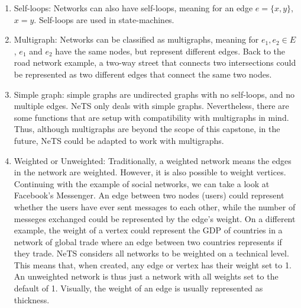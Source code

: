 \begin{enumerate}
  \item Self-loops: Networks can also have self-loops, meaning for an edge $e=\{x,y\}$, $x=y$.
  Self-loops are used in state-machines.
  \item Multigraph: Networks can be classified as multigraphs,
  meaning for $e_1,e_2\in E$, $e_1$ and $e_2$
  have the same nodes, but represent different edges. Back to the road network example, a two-way street that connects two
  intersections could be represented as two different edges that connect the same two nodes.
  \item Simple graph: simple graphs are undirected graphs with no self-loops, and no multiple edges.
  NeTS only deals with simple graphs.
  Nevertheless, there are some functions that are setup with compatibility with
  multigraphs in mind. Thus, although multigraphs are beyond the scope of this capstone,
  in the future, NeTS could be adapted to work with multigraphs.
  \item Weighted or Unweighted: Traditionally, a weighted network means the edges in the network are weighted.
  However, it is also possible to weight vertices.
  Continuing with the example of social networks,
  we can take a look at Facebook's Messenger.
  An edge between two nodes (users) could represent
  whether the users have ever sent messages to each other,
  while the number of messeges exchanged could
  be represented by the edge's weight.
  On a different example, the weight of a vertex
  could represent the GDP of countries in a
  network of global trade where an edge between
  two countries represents if they trade.
  NeTS considers all networks to be weighted on a technical level.
  This means that, when created, any edge or vertex has their weight set to 1.
  An unweighted network is thus just a network with all weights set to the default of 1.
  Visually, the weight of an edge is usually represented as thickness.
\end{enumerate}

